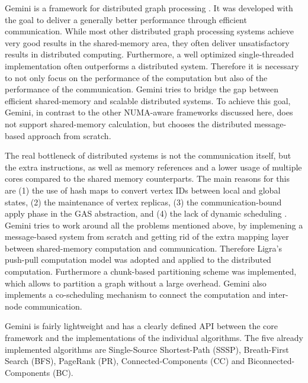 
Gemini is a framework for distributed graph processing \cite{Gemini}.
It was developed with the goal to deliver a generally better performance through efficient communication.
While most other distributed graph processing systems achieve very good results in the shared-memory area, they often deliver unsatisfactory results in distributed computing.
Furthermore, a well optimized single-threaded implementation often outperforms a distributed system.
Therefore it is necessary to not only focus on the performance of the computation but also of the performance of the communication.
Gemini tries to bridge the gap between efficient shared-memory and scalable distributed systems.
To achieve this goal, Gemini, in contrast to the other NUMA-aware frameworks discussed here, does not support shared-memory calculation, but chooses the distributed message-based approach from scratch.

The real bottleneck of distributed systems is not the communication itself, but the extra instructions, as well as memory references and a lower usage of multiple cores compared to the shared memory counterparts.
The main reasons for this are (1) the use of hash maps to convert vertex IDs between local and global states, (2) the maintenance of vertex replicas, (3) the communication-bound apply phase in the GAS abstraction, and (4) the lack of dynamic scheduling \cite{Gemini}.
Gemini tries to work around all the problems mentioned above, by implemening a message-based system from scratch and getting rid of the extra mapping layer between shared-memory computation and communication.
Therefore Ligra's push-pull computation model was adopted and applied to the distributed computation.
Furthermore a chunk-based partitioning scheme was implemented, which allows to partition a graph without a large overhead.
Gemini also implements a co-scheduling mechanism to connect the computation and inter-node communication.

Gemini is fairly lightweight and has a clearly defined API between the core framework and the implementations of the individual algorithms. The five already implemented algorithms are Single-Source Shortest-Path (SSSP), Breath-First Search (BFS), PageRank (PR), Connected-Components (CC) and Biconnected-Components (BC).

